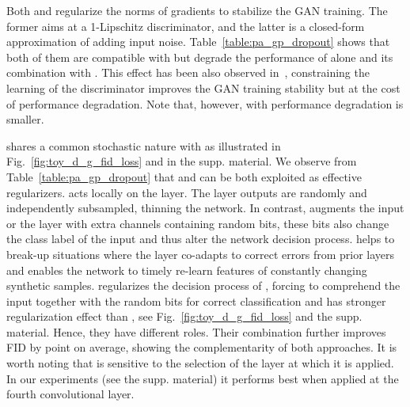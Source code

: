 \documentclass{article}
\begin{document}
Both  and  regularize the norms of gradients to stabilize the GAN training. The former aims at a 1-Lipschitz discriminator, and the latter is a closed-form approximation of adding input noise. Table~\ref{table:pa_gp_dropout} shows that both of them are compatible with  but degrade the performance of  alone and its combination with . This effect has been also observed in~\cite{Kurach2018GANlandscape,Brock2019}, constraining the learning of the discriminator improves the GAN training stability but at the cost of performance degradation. Note that, however, with  performance degradation is smaller.

 shares a common stochastic nature with  as illustrated in Fig.~\ref{fig:toy_d_g_fid_loss} and in the supp. material. We observe from Table~\ref{table:pa_gp_dropout} that  and  can be both exploited as effective regularizers.  acts locally on the layer. The layer outputs are randomly and independently subsampled, thinning the network. In contrast,  augments the input or the layer with extra channels containing random bits, these bits also change the class label of the input and thus alter the network decision process.  helps to break-up situations where the layer co-adapts to correct errors from prior layers and enables the network to timely re-learn features of constantly changing synthetic samples.  regularizes the decision process of , forcing  to comprehend the input together with the random bits for correct classification and has stronger regularization effect than , see Fig.~\ref{fig:toy_d_g_fid_loss} and the supp. material. Hence, they have different roles. Their combination further improves FID by  point on average, showing the complementarity of both approaches. It is worth noting that  is sensitive to the selection of the layer at which it is applied. In our experiments (see the supp. material) it performs best when applied at the fourth convolutional layer.
\end{document}
